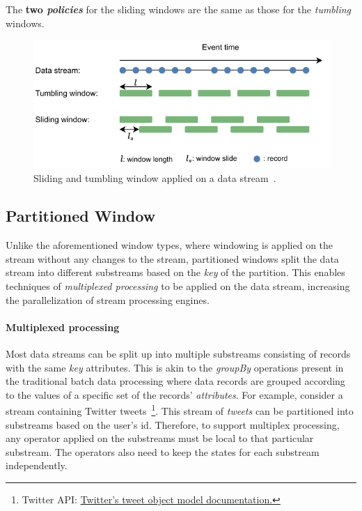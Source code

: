 The \textbf{two \emph{policies}} for the sliding windows are the same as those for the \emph{tumbling} windows. 

\begin{figure}[htpb]
    \centering
    \includegraphics[width=0.8\linewidth]{fig/slide_tumb_windows.pdf}
    \caption{Sliding and tumbling window applied on a data stream~\cite{jonas_scotty}. }%
    \label{fig:slide_tumb_window}
\end{figure}


\subsection{Partitioned Window}%
\label{sec:Partitioned Window}

Unlike the aforementioned window types, where windowing is applied on the stream 
without any changes to the stream, partitioned windows split the data stream into 
different substreams based on the \emph{key} of the partition. This enables 
techniques of \emph{multiplexed processing} to be applied on the data stream, increasing 
the parallelization of stream processing engines. 

\paragraph{Multiplexed processing}%
\label{par:Multiplexed processing}
Most data streams can be split up into multiple substreams consisting of records 
with the same \emph{key} attributes. This is akin to 
the \emph{groupBy} operations present in the traditional batch data processing where 
data records are grouped according to the values of a specific set of the records' \emph{attributes}.
For example, consider a stream containing 
Twitter tweets~\footnote{Twitter API: \href{https://developer.twitter.com/en/docs/twitter-api/v1/data-dictionary/object-model/tweet}
{Twitter's tweet object model documentation.}}. This stream of \emph{tweets} can be 
partitioned into substreams based on the user's id. 
Therefore, to support multiplex processing, any operator applied on the substreams 
must be local to that particular substream. The operators also need to keep the states for each 
substream independently. 


